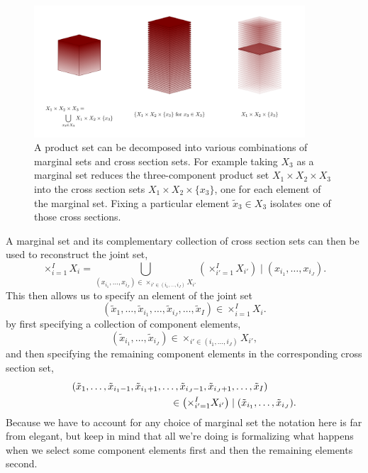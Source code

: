 \documentclass[
  letterpaper,
  DIV=11,
  numbers=noendperiod]{scrartcl}
\begin{document}
\begin{figure}

{\centering \includegraphics[width=0.9\textwidth,height=\textheight]{figures/conditioning/conditioning.pdf}

}

\caption{\label{fig-conditioning}A product set can be decomposed into
various combinations of marginal sets and cross section sets. For
example taking \(X_{3}\) as a marginal set reduces the three-component
product set \(X_{1} \times X_{2} \times X_{3}\) into the cross section
sets \(X_{1} \times X_{2} \times \{ x_{3} \}\), one for each element of
the marginal set. Fixing a particular element
\(\tilde{x}_{3} \in X_{3}\) isolates one of those cross sections.}

\end{figure}

A marginal set and its complementary collection of cross section sets
can then be used to reconstruct the joint set, \[
\times_{i = 1}^{I} X_{i}
=
\bigcup_{ (x_{i_{1}}, \ldots, x_{i_{J}}) \in \times_{ i' \in ( i_{1}, \ldots, i_{J} ) } X_{i'} }
\left( \times_{i' = 1}^{I} X_{i'} \right) \mid (x_{i_{1}}, \ldots, x_{i_{J}}).
\] This then allows us to specify an element of the joint set \[
(\tilde{x}_{1}, \ldots, \tilde{x}_{i_{1}}, \ldots, \tilde{x}_{i_{J}}, \ldots, \tilde{x}_{I})
\in \times_{i = 1}^{I} X_{i}.
\] by first specifying a collection of component elements, \[
(\tilde{x}_{i_{1}}, \ldots, \tilde{x}_{i_{J}})
\in \times_{ i' \in ( i_{1}, \ldots, i_{J} ) } X_{i'},
\] and then specifying the remaining component elements in the
corresponding cross section set, \begin{align*}
&(\tilde{x}_{1}, \ldots,
\tilde{x}_{i_{1} - 1}, \tilde{x}_{i_{1} + 1}, \ldots,
\tilde{x}_{i_{J} - 1}, \tilde{x}_{i_{J} + 1}, \ldots,
\tilde{x}_{I} )
\\
&\hspace{35mm} \in
\left( \times_{i' = 1}^{I} X_{i'} \right) \mid (\tilde{x}_{i_{1}}, \ldots, \tilde{x}_{i_{J}}).
\end{align*} Because we have to account for any choice of marginal set
the notation here is far from elegant, but keep in mind that all we're
doing is formalizing what happens when we select some component elements
first and then the remaining elements second.
\end{document}
